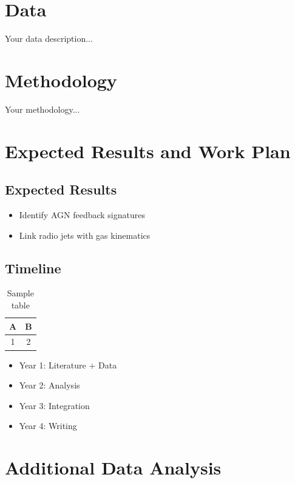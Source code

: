 \documentclass{jimma_phd_proposal}
\begin{document}
\chapter{Data}
Your data description...

\chapter{Methodology}
Your methodology...

\chapter{Expected Results and Work Plan}

\section{Expected Results}
\begin{itemize}
\item Identify AGN feedback signatures
\item Link radio jets with gas kinematics
\end{itemize}

\section{Timeline}

\begin{table}[h]
\centering
\begin{tabular}{|c|c|}
\hline
A & B \\ \hline
1 & 2 \\
\hline
\end{tabular}
\caption{Sample table}
\label{tab:data}
\end{table}

\begin{itemize}
\item Year 1: Literature + Data
\item Year 2: Analysis
\item Year 3: Integration
\item Year 4: Writing
\end{itemize}

\newpage

\appendixsection

\chapter{Additional Data Analysis}
\end{document}
